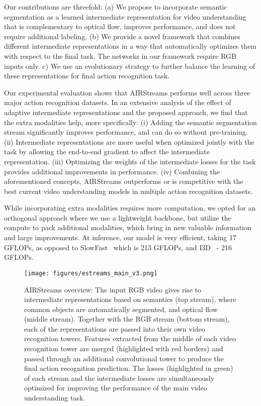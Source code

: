 \documentclass[final]{cvpr}
\begin{document}
Our contributions are threefold: (a) We propose to incorporate semantic segmentation as a learned intermediate representation for video understanding that is complementary to optical flow, improves performance, and does not require additional labeling.
(b) We provide a novel framework that combines different intermediate representations in a way that automatically optimizes them with respect to the final task. The networks in our framework require RGB inputs only. c) We use an evolutionary strategy to further balance the learning of these representations for final action recognition task.


Our experimental evaluation shows that AIRStreams performs well across three major action recognition datasets. In an extensive analysis of the effect of adaptive intermediate representations and the proposed approach, we find that the extra modalities help, more specifically: (i)  Adding the semantic segmentation stream significantly improves performance, and can do so without pre-training. (ii) Intermediate representations are more useful when optimized jointly with the task by allowing the end-to-end gradient to affect the intermediate representation. (iii) Optimizing the weights of the intermediate losses for the task provides additional improvements in performance. (iv) Combining the aforementioned concepts, AIRStreams outperforms or is competitive with the best current video understanding models in multiple action recognition datasets.

While incorporating extra modalities requires more computation, we opted for an
orthogonal approach where we use a lightweight backbone, but utilize the compute to pack additional modalities, which
bring in new valuable information and large improvements. At inference, our
model is very efficient, taking 17 GFLOPs, as opposed to SlowFast~\cite{feichtenhofer2018slowfast} which is 213 GFLOPs, and I3D~\cite{carreira2017quo} - 216 GFLOPs.



\begin{figure*}[t]
  \centering
  \texttt{[image: figures/estreams\_main\_v3.png]}\caption{
AIRStreams overview: The input RGB video gives rise to intermediate representations based on semantics (top stream), where common objects are automatically segmented, and optical flow (middle stream). Together with the RGB stream (bottom stream), each of the representations are passed into their own video recognition towers. Features extracted from the middle of each video recognition tower are merged (highlighted with red borders) and passed through an additional convolutional tower to produce the final action recognition prediction. The losses (highlighted in green) of each stream and the intermediate losses are simultaneously optimized for improving the performance of the main video understanding task.
  }
  \label{fig:overview}
\end{figure*}
\end{document}
